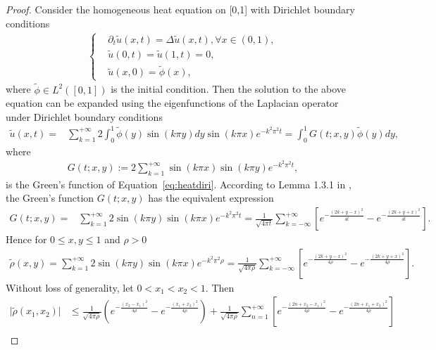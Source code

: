 \documentclass[11pt]{article}
\numberwithin{equation}{section}%
\numberwithin{figure}{section}%
\theoremstyle{remark}
\begin{document}
	\begin{proof}
		Consider the homogeneous heat equation on [0,1] with Dirichlet boundary conditions
		\begin{equation}\label{eq:heatdiri}
			\begin{split}
			\left\{
			\begin{aligned}
				&\partial_{t}\tilde{u}(x,t)=\Delta \tilde{u}(x,t),\forall{x\in (0,1)},\\
				&\tilde{u}(0,t)=\tilde{u}(1,t)=0,\\
				&\tilde{u}(x,0)=\tilde{\phi}(x),
			\end{aligned}
			\right.
			\end{split}
		\end{equation}
		where $\tilde{\phi}\in L^{2}([0,1])$ is the initial condition. Then the solution to the above equation can be expanded using the eigenfunctions of the Laplacian operator under Dirichlet boundary conditions
		\begin{align*}
			\tilde{u}(x,t)=&\sum_{k=1}^{+\infty}2\int_{0}^{1}\tilde{\phi}(y)\sin(k\pi y)dy \sin(k\pi x)e^{-k^{2}\pi^{2}t}=\int_{0}^{1}G(t;x,y)\tilde{\phi}(y)dy,
		\end{align*}
		where
		\begin{align*}
			G(t;x,y):=2\sum_{k=1}^{+\infty}\sin(k\pi x)\sin(k\pi y)e^{-k^{2}\pi^{2}t},
		\end{align*}
		is the Green's function of Equation~\eqref{eq:heatdiri}.
		According to Lemma 1.3.1 in \cite{Dalang2024book}, the Green’s function $G(t;x,y)$ has the equivalent expression
		\begin{align*}
			G(t;x,y)=&\sum_{k=1}^{+\infty}2\sin(k\pi y)\sin(k\pi x)e^{-k^{2}\pi^{2}t}
			=\frac{1}{\sqrt{4\pi t}}\sum_{k=-\infty}^{+\infty}\left[e^{-\frac{(2k+y-x)^{2}}{4t}}-e^{-\frac{(2k+y+x)^{2}}{4t}}\right].
		\end{align*}
		Hence for $0\leq x,y\leq 1$ and $\rho>0$
		 \begin{align*}
			\tilde{\rho}(x,y)=\sum_{k=1}^{+\infty}2\sin(k\pi y)\sin(k\pi x)e^{-k^{2}\pi^{2}\rho}=\frac{1}{\sqrt{4\pi\rho}}\sum_{k=-\infty}^{+\infty}\left[e^{-\frac{(2k+y-x)^{2}}{4\rho}}-e^{-\frac{(2k+y+x)^{2}}{4\rho}}\right].
		\end{align*}
		Without loss of generality, let $0< x_{1}< x_{2}< 1$. Then
		\begin{align*}
			\vert \tilde{\rho}(x_{1},x_{2})\vert&\leq\frac{1}{\sqrt{4\pi\rho}}\left(e^{-\frac{(x_{2}-x_{1})^{2}}{4\rho}}-e^{-\frac{(x_{1}+x_{2})^{2}}{4\rho}}\right)+\frac{1}{\sqrt{4\pi\rho}}\sum_{n=1}^{+\infty}\left[e^{-\frac{(2n+x_{2}-x_{1})^{2}}{4\rho}}-e^{-\frac{(2n+x_{1}+x_{2})^{2}}{4\rho}}\right]\\

\end{align*}
\end{proof}
\end{document}
